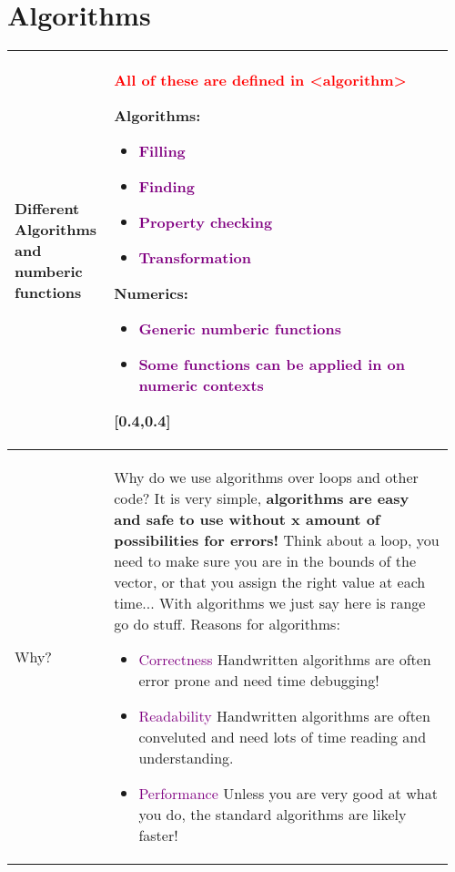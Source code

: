 \documentclass[main.tex,fontsize=8pt,paper=a4,paper=portrait,DIV=calc]{scrartcl}
\begin{document}
\begin{table}[ht!]
\section{Algorithms}
\begin{tabular}{|m{0.2\linewidth}|m{0.755\linewidth}|}
\hline 
Different Algorithms and numberic functions & 
\textcolor{red}{All of these are defined in <algorithm>}\newline
\minipg{
Algorithms:\newline
\begin{itemize}
\item \textcolor{purple}{Filling}
\item \textcolor{purple}{Finding}
\item \textcolor{purple}{Property checking}
\item \textcolor{purple}{Transformation}
\end{itemize} 
}{
Numerics:\newline
\begin{itemize}
\item \textcolor{purple}{Generic numberic functions}
\item \textcolor{purple}{Some functions can be applied in on numeric contexts}
\end{itemize} 
}[0.4,0.4]\\
\hline
Why? & 
Why do we use algorithms over loops and other code?\newline
It is very simple, \textbf{algorithms are easy and safe to use without x amount of possibilities for errors!}\newline
Think about a loop, you need to make sure you are in the bounds of the vector, or that you assign the right value at each time...\newline
With algorithms we just say here is range go do stuff.
Reasons for algorithms:\newline
\begin{itemize}
\item \textcolor{purple}{Correctness}\newline
  Handwritten algorithms are often error prone and need time debugging!
\item \textcolor{purple}{Readability}\newline
  Handwritten algorithms are often conveluted and need lots of time reading and understanding.
\item \textcolor{purple}{Performance}\newline
  Unless you are very good at what you do, the standard algorithms are likely faster!

\end{itemize}
\end{tabular}
\end{table}
\end{document}
